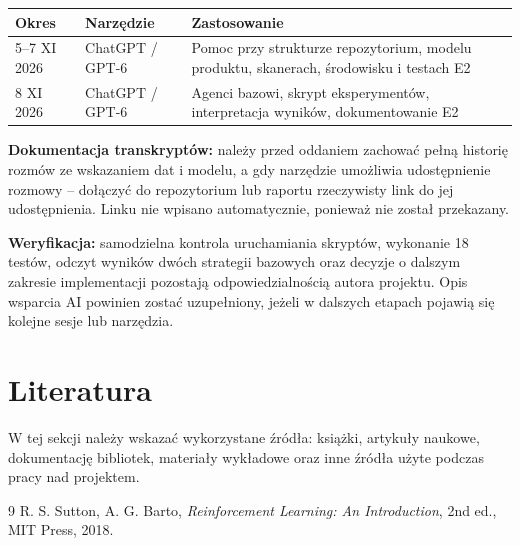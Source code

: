 \documentclass[12pt]{article}
\begin{document}
\begin{center}
\small
\renewcommand{\arraystretch}{1.2}
\begin{tabular}{p{}p{}p{}}
\toprule
Okres & Narzędzie & Zastosowanie \\
\midrule
5--7 XI 2026 & ChatGPT / GPT-6 & Pomoc przy strukturze repozytorium, modelu produktu, skanerach, środowisku i testach E2 \\
8 XI 2026 & ChatGPT / GPT-6 & Agenci bazowi, skrypt eksperymentów, interpretacja wyników, dokumentowanie E2 \\
\bottomrule
\end{tabular}
\end{center}

\noindent\textbf{Dokumentacja transkryptów:} należy przed oddaniem zachować pełną historię rozmów ze wskazaniem dat i modelu, a gdy narzędzie umożliwia udostępnienie rozmowy -- dołączyć do repozytorium lub raportu rzeczywisty link do jej udostępnienia. Linku nie wpisano automatycznie, ponieważ nie został przekazany.

\noindent\textbf{Weryfikacja:} samodzielna kontrola uruchamiania skryptów, wykonanie 18 testów, odczyt wyników dwóch strategii bazowych oraz decyzje o dalszym zakresie implementacji pozostają odpowiedzialnością autora projektu. Opis wsparcia AI powinien zostać uzupełniony, jeżeli w dalszych etapach pojawią się kolejne sesje lub narzędzia.

\section{Literatura}

W tej sekcji należy wskazać wykorzystane źródła: książki, artykuły naukowe, dokumentację bibliotek, materiały wykładowe oraz inne źródła użyte podczas pracy nad projektem.

\begin{thebibliography}{9}
R. S. Sutton, A. G. Barto, \textit{Reinforcement Learning: An Introduction}, 2nd ed., MIT Press, 2018.
\end{thebibliography}
\end{document}
